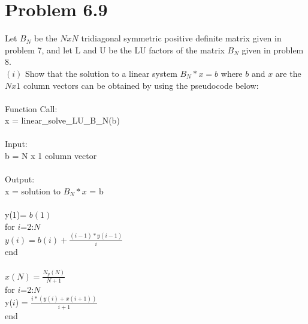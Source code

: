 \documentclass{article}
\DeclareMathOperator{\1}{\mathit{1}}
\numberwithin{figure}{section} %
\numberwithin{table}{section}
\begin{document}
\section{Problem 6.9}
\par Let \(B_N\) be the \(NxN\) tridiagonal symmetric positive definite matrix given in problem 7, and let L and U be the LU factors of the matrix  \(B_N\) given in problem 8.\\
\((i)\) Show that the solution to a linear system \(B_N*x=b\) where \(b\) and \(x\) are the \(Nx1\) column vectors can be obtained by using the pseudocode below:\\\\
			\indent \hspace{5 cm}	Function Call:\\
			\indent \hspace{5 cm}	x = linear\_solve\_LU\_B\_N(b)\\\\
			\indent \hspace{5 cm}	Input:\\
			\indent \hspace{5 cm}	b = N x 1 column vector \\\\
			\indent \hspace{5 cm}	Output:\\
			\indent \hspace{5 cm}	x = solution to \(B_N*x\) = b\\\\
			\indent \hspace{5 cm}	y(1)= \(b(1)\) \\
			\indent \hspace{5 cm}	for \(i\)=2:\(N\) \\
			\indent \hspace{5 cm}	\indent \(y(i) = b(i) + \frac{(i-1)*y(i-1)}{i}\)\\ 
			\indent \hspace{5 cm}	end \\\\
			\indent \hspace{5 cm}	\(x(N) = \frac{N_y(N)}{N+1}\)\\
			\indent \hspace{5 cm}	for \(i\)=2:\(N\) \\
			\indent \hspace{5 cm} \indent y(\(i\)) = \(\frac{i*(y(i)+x(i+1))}{i+1}\) \\
			\indent \hspace{5 cm} end \\\\
\end{document}
